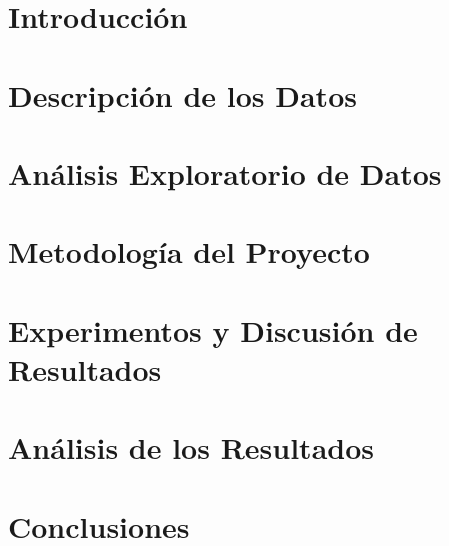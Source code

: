 \documentclass[12pt,a4paper]{article}
\begin{document}
    \tableofcontents
    \newpage

    \section{Introducción}
    {}
    \newpage

    \section{Descripción de los Datos}
    {}
    \newpage

    \section{Análisis Exploratorio de Datos}
    {}
    \newpage

    \section{Metodología del Proyecto}
    {}
    \newpage

    \section{Experimentos y Discusión de Resultados}
    {}
    \newpage

    \section{Análisis de los Resultados}
    {}
    \newpage

    \section{Conclusiones}
    {}
    \newpage

    \printbibliography[heading=bibintoc,title={Referencias Bibliográficas}]
\end{document}
